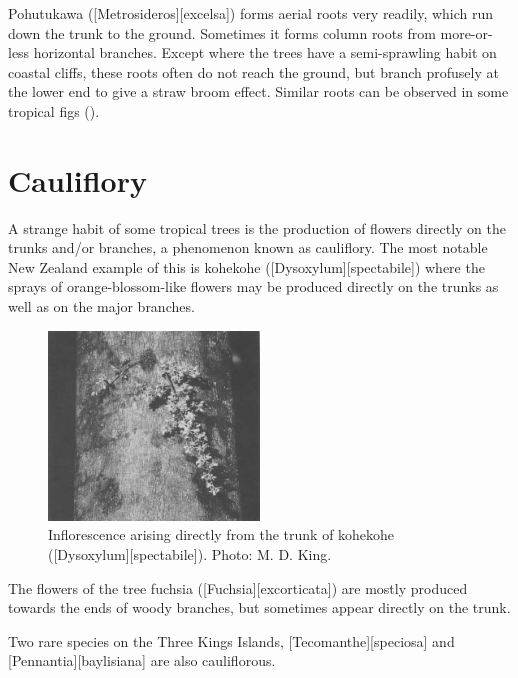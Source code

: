 Pohutukawa ([Metrosideros][excelsa]) forms aerial roots very readily, which run down the trunk to the ground.
Sometimes it forms column roots from more-or-less horizontal branches.
Except where the trees have a semi-sprawling habit on coastal cliffs, these roots often do not reach the ground, but branch profusely at the lower end to give a straw broom effect.
Similar roots can be observed in some tropical figs ().

\section{Cauliflory}

A strange habit of some tropical trees is the production of flowers directly on the trunks and/or branches, a phenomenon known as cauliflory.
The most notable New Zealand example of this is kohekohe ([Dysoxylum][spectabile]) where the sprays of orange-blossom-like flowers may be produced directly on the trunks as well as on the major branches.

\begin{figure}
	\includegraphics[width=0.5\textwidth]{graphics/figure16infloresence.jpg}
	\centering
	\caption[Inflorescence arising directly from the trunk of kohekohe]{Inflorescence arising directly from the trunk of kohekohe ([Dysoxylum][spectabile]).
	Photo:  M. D. King.}%
	\label{fig:16infloresence}
\end{figure}

The flowers of the tree fuchsia ([Fuchsia][excorticata]) are mostly produced towards the ends of woody branches, but sometimes appear directly on the trunk.

Two rare species on the Three Kings Islands, [Tecomanthe][speciosa] and [Pennantia][baylisiana] are also cauliflorous.

